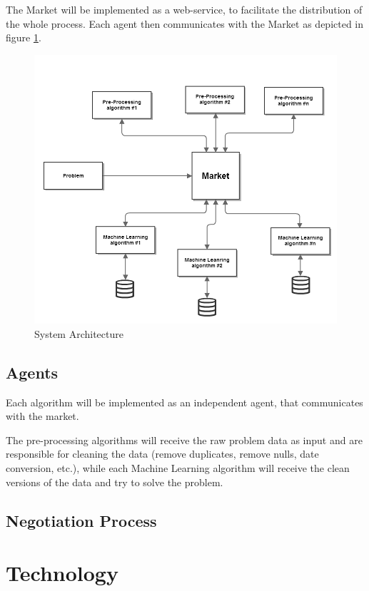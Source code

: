 \documentclass{llncs}
\begin{document}
The Market will be implemented as a web-service, to facilitate the distribution of the whole process. Each agent then communicates with the Market as depicted in figure \ref{fig:marketArc}. 
\begin{figure}
\centering
\includegraphics[width=\linewidth]{SSIM_architecture}
\caption{System Architecture}
\label{fig:marketArc}
\end{figure}


\subsection{Agents}

Each algorithm will be implemented as an independent agent, that communicates with the market. 

The pre-processing algorithms will receive the raw problem data as input and are responsible for cleaning the data (remove duplicates, remove nulls, date conversion, etc.), while each Machine Learning algorithm will receive the clean versions of the data and try to solve the problem. 





\subsection{Negotiation Process}




\section{Technology}
\end{document}
